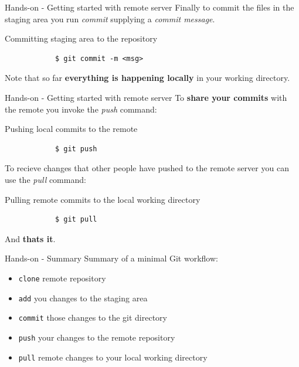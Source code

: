 \documentclass{beamer}
\begin{document}
\begin{frame}[fragile]{Hands-on - Getting started with remote server}
	Finally to commit the files in the staging area you run \emph{commit} supplying a \emph{commit message}.
	\begin{exampleblock}{Committing staging area to the repository}
		\begin{verbatim}
			$ git commit -m <msg>
		\end{verbatim}
	\end{exampleblock}
	Note that so far {\bf everything is happening locally} in your working directory.
\end{frame}

\begin{frame}[fragile]{Hands-on - Getting started with remote server}
	To {\bf share your commits} with the remote you invoke the \emph{push} command:
	\begin{exampleblock}{Pushing local commits to the remote}
		\begin{verbatim}
			$ git push
		\end{verbatim}
	\end{exampleblock}
	\vskip5pt
	To recieve changes that other people have pushed to the remote server you can use the \emph{pull} command:
	\begin{exampleblock}{Pulling remote commits to the local working directory}
		\begin{verbatim}
			$ git pull
		\end{verbatim}
	\end{exampleblock}
	\vskip5pt
	\begin{center}
		And {\bf thats it}.
	\end{center}
\end{frame}

\begin{frame}[fragile]{Hands-on - Summary}
	Summary of a minimal Git workflow:
	\begin{itemize}
		\item \verb+clone+ remote repository
		\item \verb+add+ you changes to the staging area
		\item \verb+commit+ those changes to the git directory
		\item \verb+push+ your changes to the remote repository
		\vskip15pt
		\item \verb+pull+ remote changes to your local working directory
	\end{itemize}
\end{frame}
\end{document}
